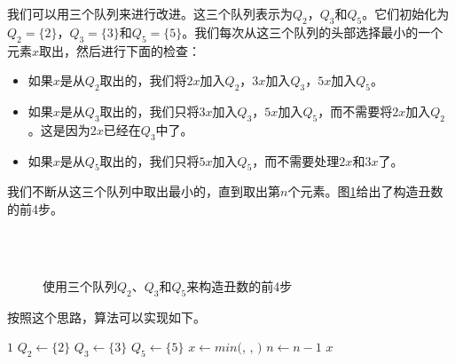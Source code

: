 \documentclass[UTF8]{article}
\begin{document}
我们可以用三个队列来进行改进。这三个队列表示为$Q_2$，$Q_3$和$Q_5$。它们初始化为$Q_2=\{ 2 \}$，$Q_3 = \{ 3\}$和$Q_5 = \{ 5 \}$。我们每次从这三个队列的头部选择最小的一个元素$x$取出，然后进行下面的检查：

\begin{itemize}
\item 如果$x$是从$Q_2$取出的，我们将$2x$加入$Q_2$，$3x$加入$Q_3$，$5x$加入$Q_5$。
\item 如果$x$是从$Q_3$取出的，我们只将$3x$加入$Q_3$，$5x$加入$Q_5$，而不需要将$2x$加入$Q_2$。这是因为$2x$已经在$Q_3$中了。
\item 如果$x$是从$Q_5$取出的，我们只将$5x$加入$Q_5$，而不需要处理$2x$和$3x$了。
\end{itemize}

我们不断从这三个队列中取出最小的，直到取出第$n$个元素。图\ref{fig:q235}给出了构造丑数的前4步。

\begin{figure}[htbp]
  \renewcommand*\thesubfigure{\arabic{subfigure}}
  \centering
   \\
   \\
  \caption{使用三个队列$Q_2$、$Q_3$和$Q_5$来构造丑数的前4步}
  \label{fig:q235}
\end{figure}

按照这个思路，算法可以实现如下。

\begin{algorithmic}[1]
    \State \Return $1$
  \Else
    \State $Q_2 \gets \{ 2 \}$
    \State $Q_3 \gets \{ 3 \}$
    \State $Q_5 \gets \{ 5 \}$
      \State $x \gets min($, , $)$
        \State {}
        \State {}
        \State {}
        \State {}
        \State {}
        \State {}
        \State {}
      \Else
        \State {}
        \State {}
      \EndIf
      \State $n \gets n - 1$
    \EndWhile
    \State \Return $x$
  \EndIf
\EndFunction
\end{algorithmic}
\end{document}
